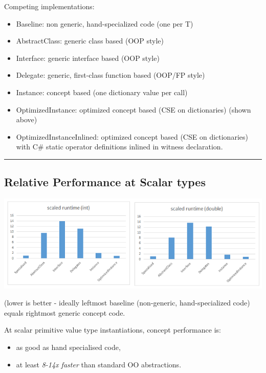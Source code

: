 Competing implementations:

\begin{itemize}
\tightlist
\item
  Baseline: non generic, hand-specialized code (one per T)
\item
  AbstractClass: generic class based (OOP style)
\item
  Interface: generic interface based (OOP style)
\item
  Delegate: generic, first-class function based (OOP/FP style)
\item
  Instance: concept based (one dictionary value per call)
\item
  OptimizedInstance: optimized concept based (CSE on dictionaries)
  (shown above)
\item
  OptimizedInstanceInlined: optimized concept based (CSE on
  dictionaries) with C\# static operator definitions inlined in witness
  declaration.
\end{itemize}

\begin{center}\rule{0.5\linewidth}{\linethickness}\end{center}

\subsection{Relative Performance at Scalar
types}\label{relative-performance-at-scalar-types}

\includegraphics{./images/perf1.png}

(lower is better - ideally leftmost baseline (non-generic,
hand-specialized code) equals rightmost generic concept code.

At scalar primitive value type instantiations, concept performance is:

\begin{itemize}
\tightlist
\item
  as good as hand specialised code,
\item
  at least \emph{8-14x faster} than standard OO abstractions.
\end{itemize}

